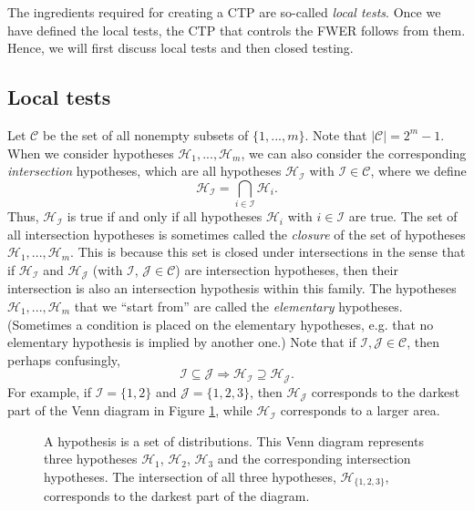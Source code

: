 \documentclass[11pt]{article}
\theoremstyle{plain}
\theoremstyle{definition}
\newcommand{\I}{\mathcal{I}}
\newcommand{\J}{\mathcal{J}}
\newcommand{\Hy}{\mathcal{H}}
\newcommand{\subs}{\mathcal{C}}
\begin{document}
The ingredients required for creating  a CTP are so-called \emph{local tests}. Once we have defined the local tests, the CTP that controls the FWER follows from them.
Hence, we will first discuss local tests and then closed testing.



\subsection{Local tests}
Let $\subs$ be the set of all nonempty subsets of $\{1,...,m\}$. Note that $|\subs| = 2^m-1$.
When we consider hypotheses $\Hy_1,...,\Hy_m$, we can also consider the corresponding \emph{intersection} hypotheses, which are all hypotheses $\Hy_{\I}$ with $\I\in \subs$, where we define
$$\Hy_{\I} = \bigcap_{i\in \I}\Hy_i.$$
Thus, $\Hy_{\I}$ is true if and only if  all hypotheses $\Hy_i$ with $i\in \I$ are true.  The set of all intersection hypotheses is sometimes called the \emph{closure} of the set of hypotheses $\Hy_1,...,\Hy_m$. This is because this set is closed under intersections in the sense that if $\Hy_{\I}$ and $\Hy_{\J}$ (with $\I$, $\J\in \subs$) are intersection hypotheses, then their intersection is also an  intersection hypothesis within this family.
The hypotheses $\Hy_1,...,\Hy_m$ that we ``start from'' are called the \emph{elementary} hypotheses. (Sometimes a condition is placed on the elementary hypotheses, e.g. that no elementary hypothesis is implied by another one.) Note that if $\I,\J\in \subs$, then perhaps confusingly,
$$\I\subseteq\J \Rightarrow  \Hy_{\I} \supseteq \Hy_{\J}.$$
For example, if $\I=\{1,2\}$ and $\J=\{1,2,3\}$, then $\Hy_{\J}$ corresponds to the darkest part of the Venn diagram in Figure \ref{fig:Venn}, while $\Hy_{\I}$ corresponds to a larger area.


\begin{figure}[h]
\centering
{}
\caption{A hypothesis is a set of distributions. This Venn diagram represents three hypotheses $\Hy_1$, $\Hy_2$, $\Hy_3$ and the corresponding intersection hypotheses. 
The intersection of all three hypotheses, $\Hy_{\{1,2,3\}}$, corresponds to the darkest part of the diagram.} \label{fig:Venn}
\end{figure}
\end{document}
